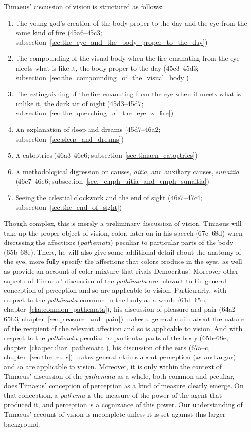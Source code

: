 Timaeus' discussion of vision is structured as follows:
\begin{enumerate}
	\item The young god's creation of the body proper to the day and the eye from the same kind of fire (45a6--45c3; subsection~\ref{sec:the_eye_and_the_body_proper_to_the_day})
	\item The compounding of the visual body when the fire emanating from the eye meets what is like it, the body proper to the day (45c3--45d3; subsection~\ref{sec:the_compounding_of_the_visual_body})
	\item The extinguishing of the fire emanating from the eye when it meets what is unlike it, the dark air of night (45d3--45d7; subsection~\ref{sec:the_quenching_of_the_eye_s_fire})
	\item An explanation of sleep and dreams (45d7--46a2; subsection~\ref{sec:sleep_and_dreams})
	\item A catoptrics (46a3--46c6; subsection~\ref{sec:timaen_catoptrics})
	\item A methodological digression on causes, \emph{aitia}, and auxiliary causes, \emph{sunaitia} (46c7--46e6; subsection~\ref{sec:_emph_aitia_and_emph_sunaitia})
	\item Seeing the celestial clockwork and the end of sight (46e7--47c4; subsection~\ref{sec:the_end_of_sight})
\end{enumerate}
Though complex, this is merely a preliminary discussion of vision. Timaeus will take up the proper object of vision, color, later on in his speech (67c–68d) when discussing the affections (\emph{pathēmata}) peculiar to particular parts of the body (65b–68e). There, he will also give some additional detail about the anatomy of the eye, more fully specify the affections that colors produce in the eyes, as well as provide an account of color mixture that rivals Democritus'. Moreover other aspects of Timaeus' discussion of the \emph{pathēmata} are relevant to his general conception of perception and so are applicable to vision. Particularly, with respect to the \emph{pathēmata} common to the body as a whole (61d–65b, chapter~\ref{cha:common_pathemata}), his discussion of pleasure and pain (64a2–65b3, chapter~\ref{sec:pleasure_and_pain}) makes a general claim about the nature of the recipient of the relevant affection and so is applicable to vision. And with respect to the \emph{pathēmata} peculiar to particular parts of the body (65b–68e, chapter~\ref{cha:peculiar_pathemata}), his discussion of the ears (67a–c, chapter~\ref{sec:the_ears}) makes general claims about perception (as \citealt{Barker:2000dy} and \citealt{Lautner:2005aa} argue) and so are applicable to vision. Moreover, it is only within the context of Timaeus' discussion of the \emph{pathēmata} as a whole, both common and peculiar, does Timaeus' conception of perception as a kind of measure clearly emerge. On that conception, a \emph{pathēma} is the measure of the power of the agent that produced it, and perception is a cognizance of this power. Our understanding of Timaeus' account of vision is incomplete unless it is set against this larger background.

